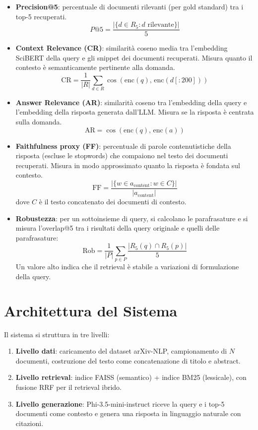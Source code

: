\documentclass[12pt,a4paper]{article}
\begin{document}
\begin{itemize}
  \item \textbf{Precision@5}: percentuale di documenti rilevanti (per gold standard) tra i top-5 recuperati.
  \[
    P@5 = \frac{|\{d \in R_5 : d \text{ rilevante}\}|}{5}
  \]

  \item \textbf{Context Relevance (CR)}: similarit\`a coseno media tra l'embedding SciBERT della query e gli snippet dei documenti recuperati. Misura quanto il contesto \`e semanticamente pertinente alla domanda.
  \[
    \text{CR} = \frac{1}{|R|} \sum_{d \in R} \cos(\text{enc}(q),\, \text{enc}(d[:200]))
  \]

  \item \textbf{Answer Relevance (AR)}: similarit\`a coseno tra l'embedding della query e l'embedding della risposta generata dall'LLM. Misura se la risposta \`e centrata sulla domanda.
  \[
    \text{AR} = \cos(\text{enc}(q),\, \text{enc}(a))
  \]

  \item \textbf{Faithfulness proxy (FF)}: percentuale di parole contenutistiche della risposta (escluse le stopwords) che compaiono nel testo dei documenti recuperati. Misura in modo approssimato quanto la risposta \`e fondata sul contesto.
  \[
    \text{FF} = \frac{|\{w \in a_{\text{content}} : w \in C\}|}{|a_{\text{content}}|}
  \]
  dove $C$ \`e il testo concatenato dei documenti di contesto.

  \item \textbf{Robustezza}: per un sottoinsieme di query, si calcolano le parafrasature e si misura l'overlap@5 tra i risultati della query originale e quelli delle parafrasature:
  \[
    \text{Rob} = \frac{1}{|P|} \sum_{p \in P} \frac{|R_5(q) \cap R_5(p)|}{5}
  \]
  Un valore alto indica che il retrieval \`e stabile a variazioni di formulazione della query.
\end{itemize}

\section{Architettura del Sistema}

Il sistema si struttura in tre livelli:

\begin{enumerate}
  \item \textbf{Livello dati}: caricamento del dataset arXiv-NLP, campionamento di $N$ documenti, costruzione del testo come concatenazione di titolo e abstract.
  \item \textbf{Livello retrieval}: indice FAISS (semantico) + indice BM25 (lessicale), con fusione RRF per il retrieval ibrido.
  \item \textbf{Livello generazione}: Phi-3.5-mini-instruct riceve la query e i top-5 documenti come contesto e genera una risposta in linguaggio naturale con citazioni.
\end{enumerate}
\end{document}
